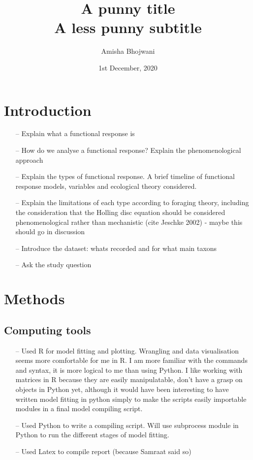 \documentclass[11pt]{article}
\title{A punny title \\ \large A less punny subtitle \\} %
\author{Amisha Bhojwani}
\date{1st December, 2020}
\begin{document}
  
  \begin{titlepage}
    \maketitle
  \end{titlepage}
  
  \tableofcontents{}
  \pagebreak

  \section{Introduction}
  \begin{itemize}
    \item[--] Explain what a functional response is 
    \item[--] How do we analyse a functional response? Explain the phenomenological approach
    \item[--] Explain the types of functional response. A brief timeline of functional response models, variables and ecological theory considered. 
    \item[--] Explain the limitations of each type according to foraging theory, including the consideration that the Holling disc equation
    should be considered phenomenological rather than mechanistic (cite Jeschke 2002) - maybe this should go in discussion
    \item[--] Introduce the dataset: whats recorded and for what main taxons
    \item[--] Ask the study question
  \end{itemize}

  \section{Methods}
    \subsection{Computing tools}
      \begin{itemize}
        \item[--] Used R for model fitting and plotting. Wrangling and data visualisation seems more comfortable for me in R. I am more familiar
        with the commands and syntax, it is more logical to me than using Python. I like working with matrices in R because they are easily
        manipulatable, don't have a grasp on objects in Python yet, although it would have been interesting to have written model fitting in
        python simply to make the scripts easily importable modules in a final model compiling script.
        \item[--] Used Python to write a compiling script. Will use subprocess module in Python to run the different stages of model fitting.
        \item[--] Used Latex to compile report (because Samraat said so)
      \end{itemize}
        
\end{document}
